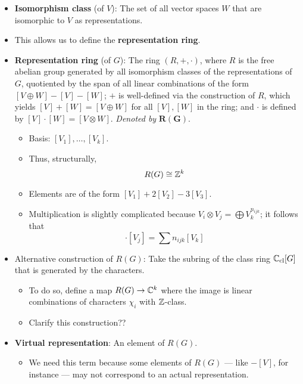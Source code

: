\documentclass[../notes.tex]{subfiles}
\begin{document}
\begin{itemize}
    \item \textbf{Isomorphism class} (of $V$): The set of all vector spaces $W$ that are isomorphic to $V$ as representations.
    \item This allows us to define the \textbf{representation ring}.
    \item \textbf{Representation ring} (of $G$): The ring $(R,+,\cdot)$, where $R$ is the free abelian group generated by all isomorphism classes of the representations of $G$, quotiented by the span of all linear combinations of the form $[V\oplus W]-[V]-[W]$; $+$ is well-defined via the construction of $R$, which yields $[V]+[W]=[V\oplus W]$ for all $[V],[W]$ in the ring; and $\cdot$ is defined by $[V]\cdot[W]=[V\otimes W]$. \emph{Denoted by} $\bm{R(G)}$.
    \begin{itemize}
        \item Basis: $[V_1],\dots,[V_k]$.
        \item Thus, structurally,
        \begin{equation*}
            R(G) \cong \mathbb{Z}^k
        \end{equation*}
        \item Elements are of the form $[V_1]+2[V_2]-3[V_3]$.
        \item Multiplication is slightly complicated because $V_i\otimes V_j=\bigoplus V_k^{n_{ijk}}$; it follows that
        \begin{equation*}
            [V_i]\cdot[V_j] = \sum n_{ijk}[V_k]
        \end{equation*}
    \end{itemize}
    \item Alternative construction of $R(G)$: Take the subring of the class ring $\mathbb{C}_\text{cl}[G]$ that is generated by the characters.
    \begin{itemize}
        \item To do so, define a map $R(G)\to\mathbb{C}^k$ where the image is linear combinations of characters $\chi_i$ with $\mathbb{Z}$-class.
        \item Clarify this construction??
    \end{itemize}
    \item \textbf{Virtual representation}: An element of $R(G)$.
    \begin{itemize}
        \item We need this term because some elements of $R(G)$ --- like $-[V]$, for instance --- may not correspond to an actual representation.

\end{itemize}
\end{itemize}
\end{document}

